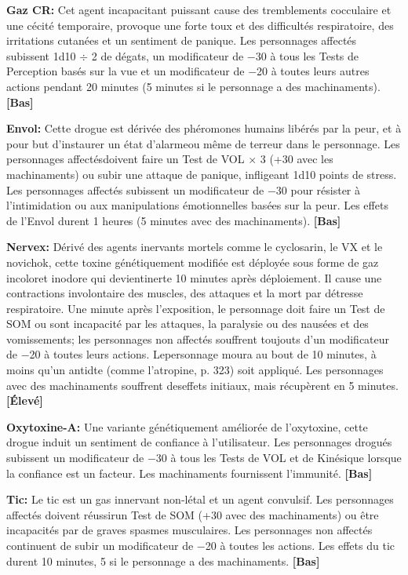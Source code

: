 \textbf{Gaz CR:} Cet agent incapacitant puissant cause des tremblements cocculaire et une cécité temporaire, provoque une forte toux et des difficultés respiratoire, des irritations cutanées et un sentiment de panique. Les personnages affectés subissent 1d10 $\div$ 2 de dégats, un modificateur de $-$30 à tous les Tests de Perception basés sur la vue et un modificateur de $-$20 à toutes leurs autres actions pendant 20 minutes (5 minutes si le personnage a des machinaments). \textbf{[Bas]} 

\textbf{Envol:} Cette drogue est dérivée des phéromones humains libérés par la peur, et à pour but d'instaurer un état d'alarmeou même de terreur dans le personnage. Les personnages affectésdoivent faire un Test de VOL $\times$ 3 (+30 avec les machinaments) ou subir une attaque de panique, infligeant 1d10 points de stress. Les personnages affectés subissent un modificateur de $-$30 pour résister à l'intimidation ou aux manipulations émotionnelles basées sur la peur. Les effets de l'Envol durent 1 heures (5 minutes avec des machinaments). \textbf{[Bas]} 

\textbf{Nervex:} Dérivé des agents inervants mortels comme le cyclosarin, le VX et le novichok, cette toxine génétiquement modifiée est déployée sous forme de gaz incoloret inodore qui devientinerte 10 minutes après déploiement. Il cause une contractions involontaire des muscles, des attaques et la mort par détresse respiratoire. Une minute après l'exposition, le personnage doit faire un Test de SOM ou sont incapacité par les attaques, la paralysie ou des nausées et des vomissements; les personnages non affectés souffrent toujouts d'un modificateur de $-$20 à toutes leurs actions. Lepersonnage moura au bout de 10 minutes, à moins qu'un antidte (comme l'atropine, p. 323) soit appliqué. Les personnages avec des machinaments souffrent deseffets initiaux, mais récupèrent en 5 minutes. \textbf{[Élevé]} 

\textbf{Oxytoxine-A:} Une variante génétiquement améliorée de l'oxytoxine, cette drogue induit un sentiment de confiance à l'utilisateur. Les personnages drogués subissent un modificateur de $-$30 à tous les Tests de VOL et de Kinésique lorsque la confiance est un facteur. Les machinaments fournissent l'immunité. \textbf{[Bas]} 

\textbf{Tic:} Le tic est un gas innervant non-létal et un agent convulsif. Les personnages affectés doivent réussirun Test de SOM (+30 avec des machinaments) ou être incapacités par de graves spasmes musculaires. Les personnages non affectés continuent de subir un modificateur de $-$20 à toutes les actions. Les effets du tic durent 10 minutes, 5 si le personnage a des machinaments. \textbf{[Bas]} 

